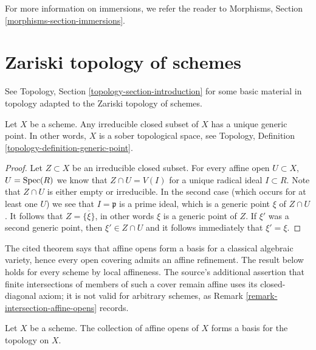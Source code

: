 \medskip\noindent
For more information on immersions, we refer the reader to
Morphisms, Section \ref{morphisms-section-immersions}.










\section{Zariski topology of schemes}
\label{section-topology}

\noindent
See Topology, Section \ref{topology-section-introduction}
for some basic material in topology adapted to the Zariski
topology of schemes.

\begin{lemma}
\label{lemma-scheme-sober}
Let $X$ be a scheme.
Any irreducible closed subset of $X$ has a unique generic point.
In other words, $X$ is a sober topological space, see
Topology, Definition \ref{topology-definition-generic-point}.
\end{lemma}

\begin{proof}
Let $Z \subset X$ be an irreducible closed subset.
For every affine open $U \subset X$, $U = \mathop{\mathrm{Spec}}(R)$
we know that $Z \cap U = V(I)$ for a unique
radical ideal $I \subset R$. Note that $Z \cap U$ is either
empty or irreducible. In the second case (which occurs
for at least one $U$) we see that $I = \mathfrak p$
is a prime ideal, which is a generic point $\xi$ of $Z \cap U$.
It follows that $Z = \overline{\{\xi\}}$, in other words
$\xi$ is a generic point of $Z$. If $\xi'$ was a second
generic point, then $\xi' \in Z \cap U$ and it follows
immediately that $\xi' = \xi$.
\end{proof}

\begin{lemma}
\label{lemma-basis-affine-opens}
\begin{reference}
\cite[Chapter II, \S 3, no. 42, Theorem 1 and Corollary, p. 234]{FAC}
\end{reference}
\begin{history}
The cited theorem says that affine opens form a basis for a classical
algebraic variety, hence every open covering admits an affine refinement.
The result below holds for every scheme by local affineness. The source's
additional assertion that finite intersections of members of such a cover
remain affine uses its closed-diagonal axiom; it is not valid for arbitrary
schemes, as Remark \ref{remark-intersection-affine-opens} records.
\end{history}
Let $X$ be a scheme. The collection of affine opens
of $X$ forms a basis for the topology on $X$.
\end{lemma}

